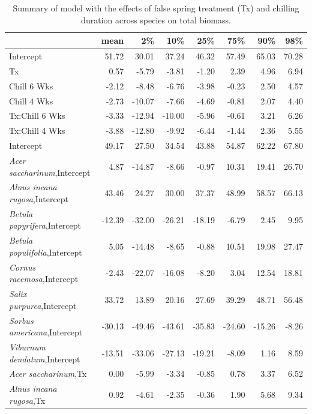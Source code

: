 \documentclass{article}\usepackage[]{graphicx}\usepackage[]{color}
\begin{document}
\newpage
\begin{longtable}{lrrrrrrr}
\caption{Summary of model with the effects of false spring treatment (Tx) and chilling duration across species on total biomass.} \\ 
  \hline
 & mean & 2\% & 10\% & 25\% & 75\% & 90\% & 98\% \\ 
  \hline \endhead  \hline
Intercept & 51.72 & 30.01 & 37.24 & 46.32 & 57.49 & 65.03 & 70.28 \\ 
  Tx & 0.57 & -5.79 & -3.81 & -1.20 & 2.39 & 4.96 & 6.94 \\ 
  Chill 6 Wks & -2.12 & -8.48 & -6.76 & -3.98 & -0.23 & 2.50 & 4.57 \\ 
  Chill 4 Wks & -2.73 & -10.07 & -7.66 & -4.69 & -0.81 & 2.07 & 4.40 \\ 
  Tx:Chill 6 Wks & -3.33 & -12.94 & -10.00 & -5.96 & -0.61 & 3.21 & 6.26 \\ 
  Tx:Chill 4 Wks & -3.88 & -12.80 & -9.92 & -6.44 & -1.44 & 2.36 & 5.55 \\ 
  Intercept & 49.17 & 27.50 & 34.54 & 43.88 & 54.87 & 62.22 & 67.80 \\ 
  \textit{Acer saccharinum},Intercept & 4.87 & -14.87 & -8.66 & -0.97 & 10.31 & 19.41 & 26.70 \\ 
  \textit{Alnus incana rugosa},Intercept & 43.46 & 24.27 & 30.00 & 37.37 & 48.99 & 58.57 & 66.13 \\ 
  \textit{Betula papyrifera},Intercept & -12.39 & -32.00 & -26.21 & -18.19 & -6.79 & 2.45 & 9.95 \\ 
  \textit{Betula populifolia},Intercept & 5.05 & -14.48 & -8.65 & -0.88 & 10.51 & 19.98 & 27.47 \\ 
  \textit{Cornus racemosa},Intercept & -2.43 & -22.07 & -16.08 & -8.20 & 3.04 & 12.54 & 18.81 \\ 
  \textit{Salix purpurea},Intercept & 33.72 & 13.89 & 20.16 & 27.69 & 39.29 & 48.71 & 56.48 \\ 
  \textit{Sorbus americana},Intercept & -30.13 & -49.46 & -43.61 & -35.83 & -24.60 & -15.26 & -8.26 \\ 
  \textit{Viburnum dendatum},Intercept & -13.51 & -33.06 & -27.13 & -19.21 & -8.09 & 1.16 & 8.59 \\ 
  \textit{Acer saccharinum},Tx & 0.00 & -5.99 & -3.34 & -0.85 & 0.78 & 3.37 & 6.52 \\ 
  \textit{Alnus incana rugosa},Tx & 0.92 & -4.61 & -2.35 & -0.36 & 1.90 & 5.68 & 9.34 \\ 

\end{longtable}
\end{document}
